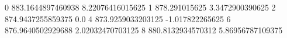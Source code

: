 0 883.1644897460938 8.22076416015625
1 878.291015625 3.3472900390625
2 874.9437255859375 0.0
4 873.9259033203125 -1.017822265625
6 876.9640502929688 2.02032470703125
8 880.8132934570312 5.86956787109375
